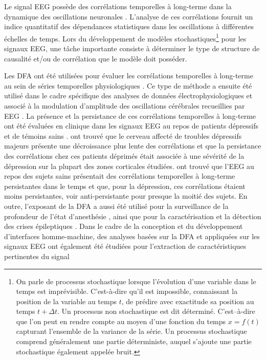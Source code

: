 Le signal EEG possède des corrélations temporelles à long-terme dans la dynamique des oscillations neuronales \citep{lee2007detrended}. 
L'analyse de ces corrélations fournit un indice quantitatif des dépendances statistiques dans les oscillations à différentes échelles de temps. 
Lors du développement de modèles stochastiques\footnote{On parle de processus stochastique lorsque l’évolution d’une variable dans le temps est imprévisible. C’est-à-dire qu’il est impossible, connaissant la position de la variable au
temps $t$, de prédire avec exactitude sa position au temps $t+\Delta t$. Un processus non stochastique est dit déterminé. C’est–à-dire que l’on peut en rendre compte au moyen d’une fonction du temps $x=f(t)$ capturant l’ensemble de la variance de la série. Un processus stochastique comprend généralement une partie déterministe, auquel s’ajoute une partie stochastique également appelée bruit.} pour les signaux EEG, une tâche importante consiste à déterminer le type de structure de causalité et/ou de corrélation que le modèle doit posséder. 

Les DFA ont été utilisées pour évaluer les corrélations temporelles à long-terme au sein de séries temporelles physiologiques \citep{goldberger2002fractal, goldberger2002physiologic, peng2002quantifying}. 
Ce type de méthode a ensuite été utilisé dans le cadre spécifique des analyses de données électrophysiologiques et associé à la modulation d'amplitude des oscillations cérébrales recueillies par EEG \citep{hardstone2012detrended}. 
La présence et la persistance de ces corrélations temporelles à long-terme ont été évaluées en clinique dans les signaux EEG au repos de patients dépressifs et de témoins sains \citep{bachmann2014detrended, lee2007detrended}. 
\cite{lee2007detrended} ont trouvé que le cerveau affecté de troubles dépressifs majeurs présente une décroissance plus lente des corrélations et que la persistance des corrélations chez ces patients déprimés était associée à une sévérité de la dépression sur la plupart des zones corticales étudiées. 
\cite{bachmann2014detrended} ont trouvé que l'EEG au repos des sujets sains présentait des corrélations temporelles à long-terme persistantes dans le temps et que, pour la dépression, ces corrélations étaient moins persistantes, voir anti-persistante pour presque la moitié des sujets. 
En outre, l'exposant de la DFA a aussi été utilisé pour la surveillance de la profondeur de l'état d'anesthésie \citep{gifani2007optimal, hosseini2018computational, jospin2007detrended, li2017monitoring, liang2015eeg, nguyen2010improving, subha2010eeg}, ainsi que pour la caractérisation et la détection des crises épileptiques \citep{adda2016detrended, hosseini2010extracting, mesquita2021detection, shalbaf2009epilepsy}.
Dans le cadre de la conception et du développement d'interfaces homme-machine, des analyses basées sur la DFA et appliquées sur les signaux EEG ont également été étudiées pour l'extraction de caractéristiques pertinentes du signal \citep{brodu2008multifractal, brodu2012exploring}

